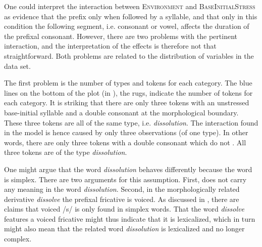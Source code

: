 %



One could interpret the interaction between \textsc{Environment} and \textsc{BaseInitialStress} as evidence that the prefix  only  when followed by a  syllable, and that only in this condition the following segment, i.e. consonant or vowel, affects the duration of the prefixal consonant. However, there are two problems with the pertinent interaction, and the interpretation of the effects is therefore not that straightforward. Both problems are related to the distribution of variables in the data set. 

The first problem is the number of types and tokens for each category. The blue lines on the bottom of the plot (in ), the rugs, indicate the number of tokens for each category. It is striking that there are only three tokens with an unstressed base-initial syllable and a double consonant at the morphological boundary. These three tokens are all of the same type, i.e. \textit{dissolution}. The interaction found in the model is hence caused by only three observations (of one type). In other words, there are only three tokens with a double consonant which do not . All three tokens are of the type \textit{dissolution}. 

One might argue that the word \textit{dissolution} behaves differently because the word is simplex. There are two arguments for this assumption. First,  does not carry any meaning in the word \textit{dissolution}. Second, in the morphologically related derivative \textit{dissolve} the prefixal fricative is voiced. As discussed in , there are claims that voiced /s/ is only found in simplex words. That the word \textit{dissolve} features a voiced fricative might thus indicate that it is lexicalized, which in turn might also mean that the related word \textit{dissolution} is lexicalized and no longer complex.

